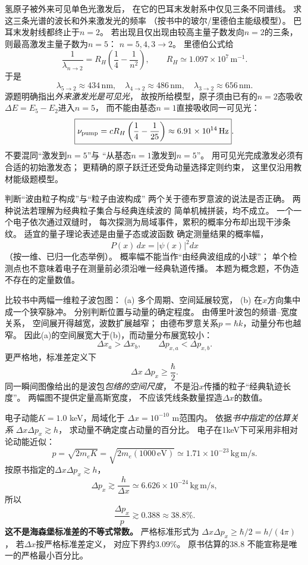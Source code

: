 \problemtext 氢原子被外来可见单色光激发后，
在它的巴耳末发射系中仅见三条不同谱线。
求这三条光谱的波长和外来激发光的频率
（按书中的玻尔/里德伯主能级模型）。
\workings
巴耳末发射线都终止于$n=2$。
若出现且仅出现由较高主量子数发向$n=2$的三条，
则最高激发主量子数为$n=5$：
$n=5,4,3\to2$。
里德伯公式给
\[
 \frac1{\lambda_{n\to2}}=
 R_H\left(\frac14-\frac1{n^2}\right),
 \qquad R_H\simeq1.097\times10^7\,\mathrm{m^{-1}}.
\]
于是
\[
 \boxed{\lambda_{5\to2}\approx434\,\mathrm{nm}},\quad
 \boxed{\lambda_{4\to2}\approx486\,\mathrm{nm}},\quad
 \boxed{\lambda_{3\to2}\approx656\,\mathrm{nm}}.
\]
源题明确指出\emph{外来激发光是可见光}，
故按所给模型，原子须由已有的$n=2$态吸收
$\Delta E=E_5-E_2$进入$n=5$，
而不能由基态$n=1$直接吸收同一可见光：
\[
 \boxed{\nu_{\rm pump}
 =cR_H\left(\frac14-\frac1{25}\right)
 \approx6.91\times10^{14}\,\mathrm{Hz}}.
\]
\crosscheck 不要混同“激发到$n=5$”与
“从基态$n=1$激发到$n=5$”。
用可见光完成激发必须有合适的初始激发态；
更精确的原子跃迁还受角动量选择定则约束，
这里仅沿用教材能级题模型。

\problemtext 判断“波由粒子构成”与“粒子由波构成”
两个关于德布罗意波的说法是否正确。
\workings
两种说法若理解为经典粒子集合与经典连续波的
简单机械拼装，均不成立。
一个一个电子依次通过双缝时，
每次探测为局域事件，累积的概率分布却出现干涉条纹。
适宜的量子理论表述是由量子态或波函数
确定测量结果的概率幅，
\[
 \boxed{P(x)\,dx=|\psi(x)|^2dx}
\]
（按一维、已归一化态举例）。
\crosscheck 概率幅不能当作“由经典波组成的小球”；
单个检测点也不意味着电子在测量前必须沿唯一经典轨道传播。
本题为概念题，不伪造不存在的定量数值。

\problemtext 比较书中两幅一维粒子波包图：
(a) 多个周期、空间延展较宽，
(b) 在$x$方向集中成一个狭窄脉冲。
分别判断位置与动量的确定程度。
\workings
由傅里叶波包的频谱--宽度关系，
空间展开得越宽，波数扩展越窄；
由德布罗意关系$p=\hbar k$，动量分布也越窄。
因此(a)的空间展宽大于(b)，而动量分布展宽较小：
\[
 \boxed{\Delta x_a>\Delta x_b},\qquad
 \boxed{\Delta p_{x,a}<\Delta p_{x,b}}.
\]
更严格地，标准差定义下
\[
 \boxed{\Delta x\,\Delta p_x\ge\frac{\hbar}{2}}.
\]
\crosscheck 同一瞬间图像给出的是波包\emph{包络的空间尺度}，
不是沿$x$传播的粒子“经典轨迹长度”。
两幅图不提供定量高斯宽度，
不应该凭线条数量捏造$\Delta x$的数值。

\problemtext 电子动能$K=1.0$ keV，局域化于
$\Delta x=10^{-10}$ m范围内。
依据\emph{书中指定的估算关系}
$\Delta x\Delta p_x\gtrsim h$，
求动量不确定度占动量的百分比。
\workings
电子在1keV下可采用非相对论动能近似：
\[
 p=\sqrt{2m_eK}
 =\sqrt{2m_e(1000\,\mathrm{eV})}
 \simeq1.71\times10^{-23}\,\mathrm{kg\,m/s}.
\]
按原书指定的$\Delta x\Delta p_x\gtrsim h$，
\[
 \Delta p_x\gtrsim\frac h{\Delta x}
 \simeq6.626\times10^{-24}\,\mathrm{kg\,m/s},
\]
所以
\[
 \boxed{\frac{\Delta p_x}{p}\gtrsim0.388
 \approx38.8\%}.
\]
\crosscheck \textbf{这不是海森堡标准差的不等式常数。}
严格标准形式为
$\Delta x\Delta p_x\ge\hbar/2=h/(4\pi)$，
若$\Delta x$按严格标准差定义，
对应下界约$3.09\%$。
原书估算的38.8%
不能宣称是唯一的严格最小百分比。

